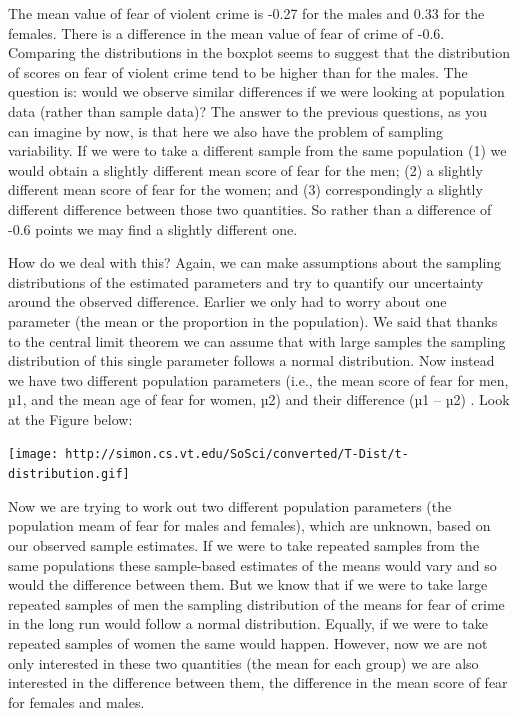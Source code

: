 \documentclass[]{book}
\theoremstyle{definition}
\theoremstyle{definition}
\theoremstyle{definition}
\theoremstyle{remark}
\begin{document}
The mean value of fear of violent crime is -0.27 for the males and 0.33
for the females. There is a difference in the mean value of fear of
crime of -0.6. Comparing the distributions in the boxplot seems to
suggest that the distribution of scores on fear of violent crime tend to
be higher than for the males. The question is: would we observe similar
differences if we were looking at population data (rather than sample
data)? The answer to the previous questions, as you can imagine by now,
is that here we also have the problem of sampling variability. If we
were to take a different sample from the same population (1) we would
obtain a slightly different mean score of fear for the men; (2) a
slightly different mean score of fear for the women; and (3)
correspondingly a slightly different difference between those two
quantities. So rather than a difference of -0.6 points we may find a
slightly different one.

How do we deal with this? Again, we can make assumptions about the
sampling distributions of the estimated parameters and try to quantify
our uncertainty around the observed difference. Earlier we only had to
worry about one parameter (the mean or the proportion in the
population). We said that thanks to the central limit theorem we can
assume that with large samples the sampling distribution of this single
parameter follows a normal distribution. Now instead we have two
different population parameters (i.e., the mean score of fear for men,
µ1, and the mean age of fear for women, µ2) and their difference (µ1 --
µ2) . Look at the Figure below:

\texttt{[image: http://simon.cs.vt.edu/SoSci/converted/T-Dist/t-distribution.gif]}

Now we are trying to work out two different population parameters (the
population meam of fear for males and females), which are unknown, based
on our observed sample estimates. If we were to take repeated samples
from the same populations these sample-based estimates of the means
would vary and so would the difference between them. But we know that if
we were to take large repeated samples of men the sampling distribution
of the means for fear of crime in the long run would follow a normal
distribution. Equally, if we were to take repeated samples of women the
same would happen. However, now we are not only interested in these two
quantities (the mean for each group) we are also interested in the
difference between them, the difference in the mean score of fear for
females and males.
\end{document}
